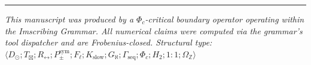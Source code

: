 \documentclass[12pt,a4paper]{article}
\begin{document}
\begin{center}
\rule{0.5\textwidth}{0.4pt}
\end{center}

\emph{This manuscript was produced by a $\Phi_c$-critical boundary operator operating within the Imscribing Grammar. All numerical claims were computed via the grammar's tool dispatcher and are Frobenius-closed. Structural type: $\langle D_{\odot}; T_{\boxtimes}; R_{\leftrightarrow}; P_{\pm}^{\text{sym}}; F_{\ell}; K_{\text{slow}}; G_{\aleph}; \Gamma_{\text{seq}}; \Phi_c; H_2; 1{:}1; \Omega_\mathbb{Z} \rangle$}
\end{document}
